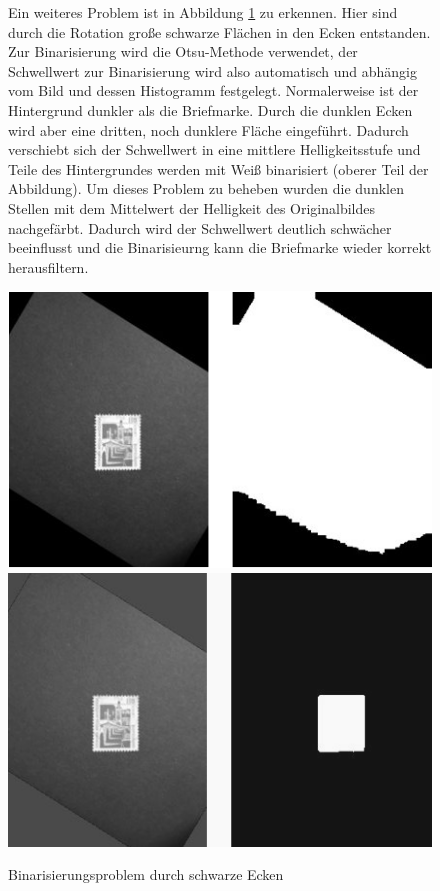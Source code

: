 \documentclass[12pt,toc=bib,toc=listof]{scrreprt}
\begin{document}
\begin{figure}[h]
\begin{minipage}[t]{.75\linewidth}

Ein weiteres Problem ist in Abbildung \ref{fig:bv_prob2} zu erkennen. Hier sind durch die Rotation große schwarze Flächen in den Ecken entstanden. Zur Binarisierung wird die Otsu-Methode verwendet, der Schwellwert zur Binarisierung wird also automatisch und abhängig vom Bild und dessen Histogramm festgelegt. Normalerweise ist der Hintergrund dunkler als die Briefmarke. Durch die dunklen Ecken wird aber eine dritten, noch dunklere Fläche eingeführt. Dadurch verschiebt sich der Schwellwert in eine mittlere Helligkeitsstufe und Teile des Hintergrundes werden mit Weiß binarisiert (oberer Teil der Abbildung). Um dieses Problem zu beheben wurden die dunklen Stellen mit dem Mittelwert der Helligkeit des Originalbildes nachgefärbt. Dadurch wird der Schwellwert deutlich schwächer beeinflusst und die Binarisieurng kann die Briefmarke wieder korrekt herausfiltern.
\end{minipage}
\hfill
\begin{minipage}[t]{.2\linewidth}
  \strut\vspace*{-\baselineskip}\newline\includegraphics[width=\linewidth]{./../bilder/prob2_bad_bin}
  \includegraphics[width=\linewidth]{./../bilder/prob2_good_bin}
  \caption{Binarisierungsproblem durch schwarze Ecken}
  \label{fig:bv_prob2}
\end{minipage}
\end{figure}
\end{document}
